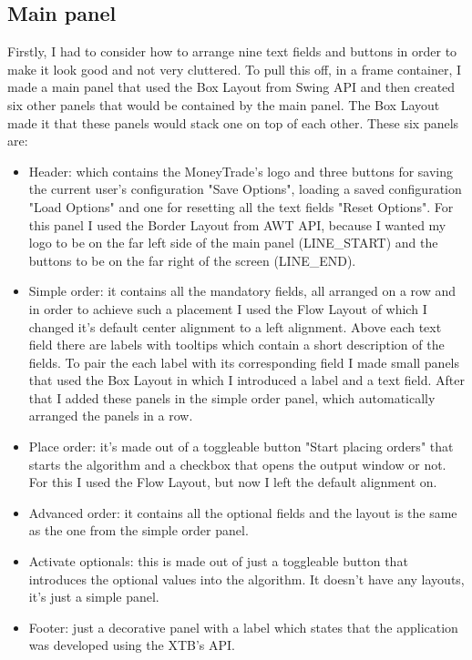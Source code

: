 \documentclass[12pt,a4paper]{report}
\begin{document}
\subsection{Main panel}
Firstly, I had to consider how to arrange nine text fields and buttons in order to make it look good and not very cluttered. To pull this off, in a frame container, I made a main panel that used the Box Layout from Swing API and then created six other panels that would be contained by the main panel. The Box Layout made it that these panels would stack one on top of each other. These six panels are:
\begin{itemize}
 	\item Header: which contains the MoneyTrade's logo and three buttons for saving the current user's configuration "Save Options", loading a saved configuration "Load Options" and one for resetting all the text fields "Reset Options". For this panel I used the Border Layout from AWT API, because I wanted my logo to be on the far left side of the main panel (LINE\_START) and the buttons to be on the far right of the screen (LINE\_END).   
 	\item Simple order: it contains all the mandatory fields, all arranged on a row and in order to achieve such a placement I used the Flow Layout of which I changed it's default center alignment to a left alignment. Above each text field there are labels with tooltips which contain a short description of the fields. To pair the each label with its corresponding field I made small panels that used the Box Layout in which I introduced a label and a text field. After that I added these panels in the simple order panel, which automatically arranged the panels in a row.    
 	\item Place order: it's made out of a toggleable button "Start placing orders" that starts the algorithm and a checkbox that opens the output window or not. For this I used the Flow Layout, but now I left the default alignment on.  
 	\item Advanced order: it contains all the optional fields and the layout is the same as the one from the simple order panel.
 	\item Activate optionals: this is made out of just a toggleable button that introduces the optional values into the algorithm. It doesn't have any layouts, it's just a simple panel.
 	\item Footer: just a decorative panel with a label which states that the application was developed using the XTB's API. 
\end{itemize}
\end{document}
